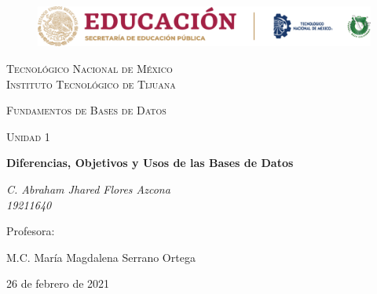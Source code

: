 \documentclass[letterpaper, 12pt]{article}
\begin{document}
    
    \begin{titlepage}
        \begin{figure}[ht]
            \centering
            \includegraphics[width=15cm]{logosITT.png}
        \end{figure}
        \centering
        {\scshape\LARGE Tecnológico Nacional de México\\Instituto Tecnológico de Tijuana\par}
        \vspace{1cm}
        {\scshape\Large Fundamentos de Bases de Datos\par}
        \vspace{1cm}
        {\scshape\Large Unidad 1\par}
        \vspace{1.5cm}
        {\huge\bfseries Diferencias, Objetivos y Usos de las Bases de Datos\par}
        \vspace{2cm}
        {\Large\itshape C. Abraham Jhared Flores Azcona\\19211640\par}
        \vfill
        Profesora: \par
        M.C. María Magdalena Serrano Ortega
    
        \vfill

        {\large 26 de febrero de 2021}
    \end{titlepage}

    \newpage
        \thispagestyle{empty}
        \tableofcontents %
        \listoffigures %
\end{document}
